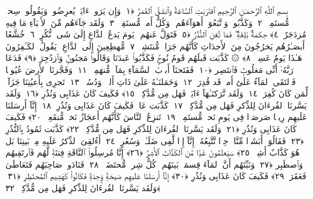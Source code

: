 
  
    
  
    
    

\nopagebreak
  بِسمِ ٱللَّهِ ٱلرَّحمَـٰنِ ٱلرَّحِيمِ
  ٱقتَرَبَتِ ٱلسَّاعَةُ وَٱنشَقَّ ٱلقَمَرُ ﴿١﴾
 وَإِن يَرَوا۟ ءَايَةًۭ يُعرِضُوا۟ وَيَقُولُوا۟ سِحرٌۭ مُّستَمِرٌّۭ ﴿٢﴾
 وَكَذَّبُوا۟ وَٱتَّبَعُوٓا۟ أَهوَآءَهُم ۚ وَكُلُّ أَمرٍۢ مُّستَقِرٌّۭ ﴿٣﴾
 وَلَقَد جَآءَهُم مِّنَ ٱلأَنۢبَآءِ مَا فِيهِ مُزدَجَرٌ ﴿٤﴾
 حِكمَةٌۢ بَٰلِغَةٌۭ ۖ فَمَا تُغنِ ٱلنُّذُرُ ﴿٥﴾
 فَتَوَلَّ عَنهُم ۘ يَومَ يَدعُ ٱلدَّاعِ إِلَىٰ شَىءٍۢ نُّكُرٍ ﴿٦﴾
 خُشَّعًا أَبصَـٰرُهُم يَخرُجُونَ مِنَ ٱلأَجدَاثِ كَأَنَّهُم جَرَادٌۭ مُّنتَشِرٌۭ ﴿٧﴾
 مُّهطِعِينَ إِلَى ٱلدَّاعِ ۖ يَقُولُ ٱلكَـٰفِرُونَ هَـٰذَا يَومٌ عَسِرٌۭ ﴿٨﴾
 ۞ كَذَّبَت قَبلَهُم قَومُ نُوحٍۢ فَكَذَّبُوا۟ عَبدَنَا وَقَالُوا۟ مَجنُونٌۭ وَٱزدُجِرَ ﴿٩﴾
 فَدَعَا رَبَّهُۥٓ أَنِّى مَغلُوبٌۭ فَٱنتَصِر ﴿١٠﴾
 فَفَتَحنَآ أَبوَٟبَ ٱلسَّمَآءِ بِمَآءٍۢ مُّنهَمِرٍۢ ﴿١١﴾
 وَفَجَّرنَا ٱلأَرضَ عُيُونًۭا فَٱلتَقَى ٱلمَآءُ عَلَىٰٓ أَمرٍۢ قَد قُدِرَ ﴿١٢﴾
 وَحَمَلنَـٰهُ عَلَىٰ ذَاتِ أَلوَٟحٍۢ وَدُسُرٍۢ ﴿١٣﴾
 تَجرِى بِأَعيُنِنَا جَزَآءًۭ لِّمَن كَانَ كُفِرَ ﴿١٤﴾
 وَلَقَد تَّرَكنَـٰهَآ ءَايَةًۭ فَهَل مِن مُّدَّكِرٍۢ ﴿١٥﴾
 فَكَيفَ كَانَ عَذَابِى وَنُذُرِ ﴿١٦﴾
 وَلَقَد يَسَّرنَا ٱلقُرءَانَ لِلذِّكرِ فَهَل مِن مُّدَّكِرٍۢ ﴿١٧﴾
 كَذَّبَت عَادٌۭ فَكَيفَ كَانَ عَذَابِى وَنُذُرِ ﴿١٨﴾
 إِنَّآ أَرسَلنَا عَلَيهِم رِيحًۭا صَرصَرًۭا فِى يَومِ نَحسٍۢ مُّستَمِرٍّۢ ﴿١٩﴾
 تَنزِعُ ٱلنَّاسَ كَأَنَّهُم أَعجَازُ نَخلٍۢ مُّنقَعِرٍۢ ﴿٢٠﴾
 فَكَيفَ كَانَ عَذَابِى وَنُذُرِ ﴿٢١﴾
 وَلَقَد يَسَّرنَا ٱلقُرءَانَ لِلذِّكرِ فَهَل مِن مُّدَّكِرٍۢ ﴿٢٢﴾
 كَذَّبَت ثَمُودُ بِٱلنُّذُرِ ﴿٢٣﴾
 فَقَالُوٓا۟ أَبَشَرًۭا مِّنَّا وَٟحِدًۭا نَّتَّبِعُهُۥٓ إِنَّآ إِذًۭا لَّفِى ضَلَـٰلٍۢ وَسُعُرٍ ﴿٢٤﴾
 أَءُلقِىَ ٱلذِّكرُ عَلَيهِ مِنۢ بَينِنَا بَل هُوَ كَذَّابٌ أَشِرٌۭ ﴿٢٥﴾
 سَيَعلَمُونَ غَدًۭا مَّنِ ٱلكَذَّابُ ٱلأَشِرُ ﴿٢٦﴾
 إِنَّا مُرسِلُوا۟ ٱلنَّاقَةِ فِتنَةًۭ لَّهُم فَٱرتَقِبهُم وَٱصطَبِر ﴿٢٧﴾
 وَنَبِّئهُم أَنَّ ٱلمَآءَ قِسمَةٌۢ بَينَهُم ۖ كُلُّ شِربٍۢ مُّحتَضَرٌۭ ﴿٢٨﴾
 فَنَادَوا۟ صَاحِبَهُم فَتَعَاطَىٰ فَعَقَرَ ﴿٢٩﴾
 فَكَيفَ كَانَ عَذَابِى وَنُذُرِ ﴿٣٠﴾
 إِنَّآ أَرسَلنَا عَلَيهِم صَيحَةًۭ وَٟحِدَةًۭ فَكَانُوا۟ كَهَشِيمِ ٱلمُحتَظِرِ ﴿٣١﴾
 وَلَقَد يَسَّرنَا ٱلقُرءَانَ لِلذِّكرِ فَهَل مِن مُّدَّكِرٍۢ ﴿٣٢﴾
